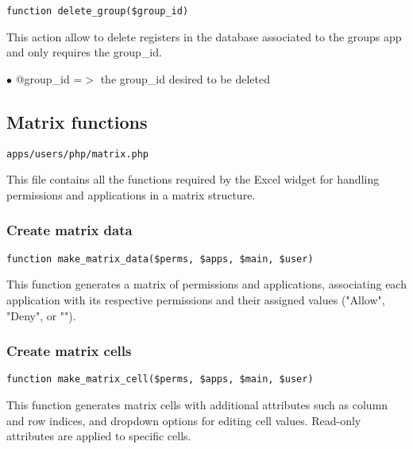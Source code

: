 \documentclass[a4paper]{article}
\begin{document}
\begin{lstlisting}
function delete_group($group_id)
\end{lstlisting}

This action allow to delete registers in the database associated to
the groups app and only requires the group\_id.

\begin{compactitem}
\item[\color{myblue}$\bullet$] @group\_id =$>$ the group\_id desired to be deleted
\end{compactitem}

\hypertarget{toc187}{}
\subsection{Matrix functions}

\begin{lstlisting}
apps/users/php/matrix.php
\end{lstlisting}

This file contains all the functions required by the Excel widget for handling
permissions and applications in a matrix structure.

\hypertarget{toc188}{}
\subsubsection{Create matrix data}

\begin{lstlisting}
function make_matrix_data($perms, $apps, $main, $user)
\end{lstlisting}

This function generates a matrix of permissions and applications, associating each
application with its respective permissions and their assigned values ("Allow", "Deny", or "").

\hypertarget{toc189}{}
\subsubsection{Create matrix cells}

\begin{lstlisting}
function make_matrix_cell($perms, $apps, $main, $user)
\end{lstlisting}

This function generates matrix cells with additional attributes such as column and row indices,
and dropdown options for editing cell values. Read-only attributes are applied to specific cells.
\end{document}
